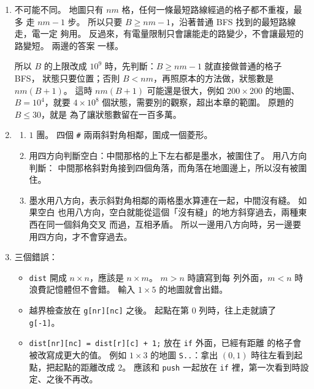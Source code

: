 \begin{enumerate}
\item 不可能不同。 地圖只有 $nm$ 格，任何一條最短路線經過的格子都不重複，最多
走 $nm - 1$ 步。 所以只要 $B \ge nm - 1$，沿著普通 BFS 找到的最短路線走，電一定
夠用。 反過來，有電量限制只會讓能走的路變少，不會讓最短的路變短。 兩邊的答案
一樣。

所以 $B$ 的上限改成 $10^9$ 時，先判斷：$B \ge nm - 1$ 就直接做普通的格子 BFS，
狀態只要位置；否則 $B < nm$，再照原本的方法做，狀態數是 $nm(B + 1)$。 這時
$nm(B+1)$ 可能還是很大，例如 $200 \times 200$ 的地圖、$B = 10^4$，就要
$4 \times 10^8$ 個狀態，需要別的觀察，超出本章的範圍。 原題的 $B \le 30$，就是
為了讓狀態數留在一百多萬。

\item
\begin{enumerate}
\item $1$ 團。 四個 \texttt{\#} 兩兩斜對角相鄰，圍成一個菱形。
\item 用四方向判斷空白：中間那格的上下左右都是墨水，被圍住了。 用八方向判斷：
中間那格斜對角接到四個角落，而角落在地圖邊上，所以沒有被圍住。
\item 墨水用八方向，表示斜對角相鄰的兩格墨水算連在一起，中間沒有縫。 如果空白
也用八方向，空白就能從這個「沒有縫」的地方斜穿過去，兩種東西在同一個斜角交叉
而過，互相矛盾。 所以一邊用八方向時，另一邊要用四方向，才不會穿過去。
\end{enumerate}

\item 三個錯誤：
\begin{itemize}
\item \texttt{dist} 開成 $n \times n$，應該是 $n \times m$。 $m > n$ 時讀寫到每
列外面，$m < n$ 時浪費記憶體但不會錯。 輸入 $1 \times 5$ 的地圖就會出錯。
\item 越界檢查放在 \texttt{g[nr][nc]} 之後。 起點在第 $0$ 列時，往上走就讀了
\texttt{g[-1]}。
\item \texttt{dist[nr][nc] = dist[r][c] + 1;} 放在 \texttt{if} 外面，已經有距離
的格子會被改寫成更大的值。 例如 $1 \times 3$ 的地圖 \texttt{S..}：拿出
$(0, 1)$ 時往左看到起點，把起點的距離改成 $2$。 應該和 \texttt{push} 一起放在
\texttt{if} 裡，第一次看到時設定、之後不再改。
\end{itemize}
\end{enumerate}
